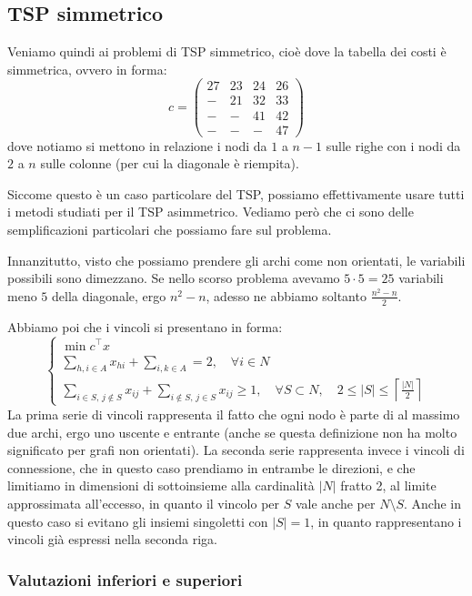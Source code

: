 \documentclass[a4paper,11pt]{article}
\begin{document}
\subsection{TSP simmetrico}
Veniamo quindi ai problemi di TSP simmetrico, cioè dove la tabella dei costi è simmetrica, ovvero in forma:
$$
c =
\begin{pmatrix}
	27 & 23 & 24 & 26 \\ 
	- & 21 & 32 & 33 \\ 
	- & - & 41 & 42 \\ 
	- & - & - & 47
\end{pmatrix}
$$
dove notiamo si mettono in relazione i nodi da $1$ a $n-1$ sulle righe con i nodi da $2$ a $n$ sulle colonne (per cui la diagonale è riempita).

Siccome questo è un caso particolare del TSP, possiamo effettivamente usare tutti i metodi studiati per il TSP asimmetrico.
Vediamo però che ci sono delle semplificazioni particolari che possiamo fare sul problema.

Innanzitutto, visto che possiamo prendere gli archi come non orientati, le variabili possibili sono dimezzano.
Se nello scorso problema avevamo $5 \cdot 5 = 25$ variabili meno $5$ della diagonale, ergo $n^2 - n$, adesso ne abbiamo soltanto $\frac{n^2 - n}{2}$. 

Abbiamo poi che i vincoli si presentano in forma:
\[
	\begin{cases}
		\min c^\intercal x \\ 
		\sum\limits_{h,i \in A} x_{hi} + \sum\limits_{i,k \in A} = 2, \quad \forall i \in N \\
		\sum\limits_{i \in S, \, j \notin S} x_{ij} + \sum\limits_{i \notin S, \, j \in S} x_{ij} \geq 1, \quad \forall S \subset N, \quad 2 \leq |S| \leq \left\lceil \frac{|N|}{2} \right\rceil
	\end{cases}
\]
La prima serie di vincoli rappresenta il fatto che ogni nodo è parte di al massimo due archi, ergo uno uscente e entrante (anche se questa definizione non ha molto significato per grafi non orientati). 
La seconda serie rappresenta invece i vincoli di connessione, che in questo caso prendiamo in entrambe le direzioni, e che limitiamo in dimensioni di sottoinsieme alla cardinalità $|N|$ fratto 2, al limite approssimata all'eccesso, in quanto il vincolo per $S$ vale anche per $N \setminus S$. 
Anche in questo caso si evitano gli insiemi singoletti con $|S| = 1$, in quanto rappresentano i vincoli già espressi nella seconda riga.

\subsubsection{Valutazioni inferiori e superiori}
\end{document}
